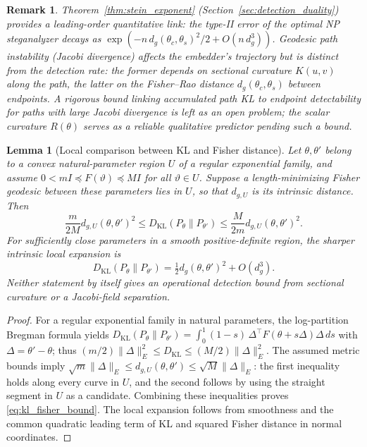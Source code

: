 \documentclass[a4paper,fleqn]{cas-dc}
\newtheorem{lemma}{Lemma}
\newtheorem{remark}{Remark}
\begin{document}
\begin{remark}%
  \label{rem:bridge}
  Theorem~\ref{thm:stein_exponent} (Section~\ref{sec:detection_duality})
  provides a leading-order quantitative link:
  the type-II error of the optimal NP steganalyzer decays as
  $\exp(-n\,d_g(\theta_c,\theta_s)^2/2 + O(n\,d_g^3))$.
  Geodesic path instability (Jacobi divergence) affects the embedder's
  trajectory but is \emph{distinct} from the detection rate:
  the former depends on sectional curvature $K(u,v)$ along the path,
  the latter on the Fisher--Rao distance $d_g(\theta_c,\theta_s)$
  between endpoints.
  A rigorous bound linking \emph{accumulated path KL} to endpoint
  detectability for paths with large Jacobi divergence is left as an open
  problem; the scalar curvature $R(\theta)$ serves as a reliable
  \emph{qualitative} predictor pending such a bound.
\end{remark}

\begin{lemma}[Local comparison between KL and Fisher distance]
  \label{lem:kl_fisher_bound}
  Let $\theta,\theta'$ belong to a convex natural-parameter region
  $U$ of a regular exponential family, and assume
  $0<mI\preceq F(\vartheta)\preceq MI$ for all $\vartheta\in U$.
  Suppose a length-minimizing Fisher geodesic between these parameters
  lies in $U$, so that $d_{g,U}$ is its intrinsic distance. Then
  \begin{equation}
    \frac{m}{2M}d_{g,U}(\theta,\theta')^2
    \le D_{\mathrm{KL}}(P_\theta\|P_{\theta'})
    \le\frac{M}{2m}d_{g,U}(\theta,\theta')^2.
    \label{eq:kl_fisher_bound}
  \end{equation}
  For sufficiently close parameters in a smooth positive-definite region,
  the sharper intrinsic local expansion is
  \begin{equation}
    D_{\mathrm{KL}}(P_\theta\|P_{\theta'})
    =\tfrac12 d_g(\theta,\theta')^2+O(d_g^3).
    \label{eq:kl_curvature_bound}
  \end{equation}
  Neither statement by itself gives an operational detection bound
  from sectional curvature or a Jacobi-field separation.
\end{lemma}
\begin{proof}
  For a regular exponential family in natural parameters, the
  log-partition Bregman formula yields
  $D_{\mathrm{KL}}(P_\theta\|P_{\theta'})
  =\int_0^1(1-s)\,\Delta^\top F(\theta+s\Delta)\Delta\,ds$
  with $\Delta=\theta'-\theta$; thus
  $(m/2)\|\Delta\|_E^2\le D_{\mathrm{KL}}
  \le(M/2)\|\Delta\|_E^2$.
  The assumed metric bounds imply
  $\sqrt m\|\Delta\|_E\le d_{g,U}(\theta,\theta')
   \le\sqrt M\|\Delta\|_E$:
  the first inequality holds along every curve in $U$, and the
  second follows by using the straight segment in $U$ as a candidate.
  Combining these inequalities proves \eqref{eq:kl_fisher_bound}.
  The local expansion follows from smoothness and the common quadratic
  leading term of KL and squared Fisher distance in normal coordinates.
\end{proof}
\end{document}
